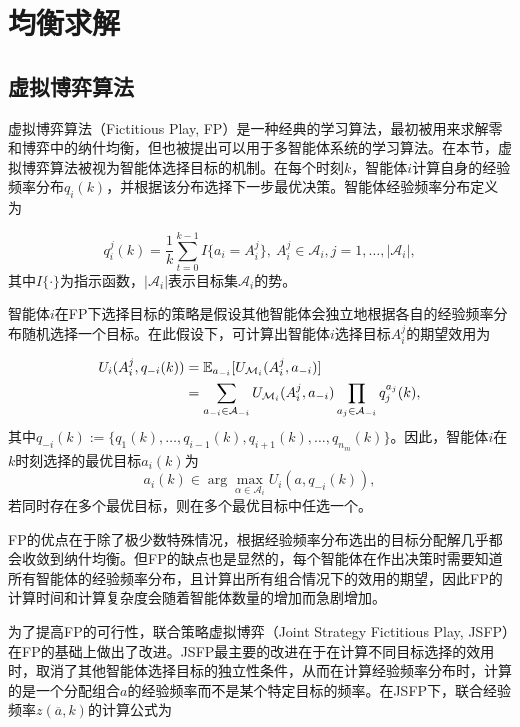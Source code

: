 \section{均衡求解}
\label{pg:pgta:protocal}

\subsection{虚拟博弈算法}
\label{pgta:protocal:FP}
虚拟博弈算法（Fictitious Play, FP）是一种经典的学习算法，最初被用来求解零和博弈中的纳什均衡，但也被提出可以用于多智能体系统的学习算法。在本节，虚拟博弈算法被视为智能体选择目标的机制。在每个时刻$k$，智能体$i$计算自身的经验频率分布$q_i(k)$，并根据该分布选择下一步最优决策。智能体经验频率分布定义为

\begin{equation}
\label{pg:eq:frequency}
	q_i^j(k) = \frac{1}{k} \sum_{t=0}^{k-1} I\{a_i = A_i^j\},\ A_i^j \in \mathcal{A}_i, j = 1,\dots,|\mathcal{A}_i|,
\end{equation}
其中$I\{\cdot\}$为指示函数，$|\mathcal{A}_i|$表示目标集$\mathcal{A}_i$的势。

智能体$i$在FP下选择目标的策略是假设其他智能体会独立地根据各自的经验频率分布随机选择一个目标。在此假设下，可计算出智能体$i$选择目标$A_i^j$的期望效用为

\begin{align}
\label{pg:eq:expectU}
	U_i(A_i^j, q_{-i}(k)) &= \mathbb{E}_{a_{-i}}[U_{\mathcal{M}_i}(A_i^j,a_{-i})]\notag\\
	&= \sum_{a_{-i}\in \mathcal{A}_{-i}} U_{\mathcal{M}_i}(A_i^j, a_{-i}) \prod_{a_j \in \mathcal{A}_{-i}} q_j^{a_j}(k),
\end{align}
其中$q_{-i}(k):=\{q_1(k),\dots,q_{i-1}(k),q_{i+1}(k),\dots,q_{n_m}(k)\}$。因此，智能体$i$在$k$时刻选择的最优目标$a_i(k)$为
\begin{equation}
\label{pg:eq:bestResponse}
	a_i(k) \in \arg \max_{\alpha \in \mathcal{A}_i} U_i(a, q_{-i}(k)),
\end{equation}
若同时存在多个最优目标，则在多个最优目标中任选一个。

FP的优点在于除了极少数特殊情况，根据经验频率分布选出的目标分配解几乎都会收敛到纳什均衡。但FP的缺点也是显然的，每个智能体在作出决策时需要知道所有智能体的经验频率分布，且计算出所有组合情况下的效用的期望，因此FP的计算时间和计算复杂度会随着智能体数量的增加而急剧增加。

为了提高FP的可行性，联合策略虚拟博弈（Joint Strategy Fictitious Play, JSFP）在FP的基础上做出了改进。JSFP最主要的改进在于在计算不同目标选择的效用时，取消了其他智能体选择目标的独立性条件，从而在计算经验频率分布时，计算的是一个分配组合$a$的经验频率而不是某个特定目标的频率。在JSFP下，联合经验频率$z(\overline a,k)$的计算公式为

